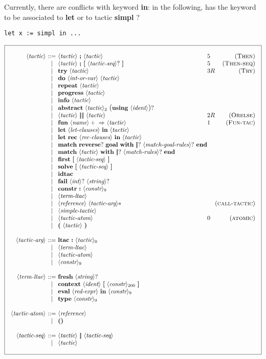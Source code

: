 \documentclass{article}
\makeatletter
\def\bfbar{\ensuremath{|\hskip -0.22em{}|\hskip -0.24em{}|}}
\def\TERMbar{\bfbar}
\def\TERMbarbar{\bfbar\bfbar}
\def\GR#1{\text{\large(}#1\text{\large)}}
\def\NT#1{\langle\textit{#1}\rangle}
\def\NTL#1#2{\langle\textit{#1}\rangle_{#2}}
\def\TERM#1{{\bf\textrm{\bf #1}}}
\def\KWD#1{\TERM{#1}}
\def\STAR#1{#1*}
\def\PLUS#1{#1+}
\def\OPT#1{#1?}
\def\OPTGR#1{\GR{#1}?}
\newenvironment{cadre}
        {\begin{array}{|c|}\hline\\}
        {\\\\\hline\end{array}}
\newenvironment{rulebox}
        {$$\begin{cadre}\begin{array}{r@{~}c@{~}l@{}l@{}r}}
        {\end{array}\end{cadre}$$}
\def\DEFNT#1{\NT{#1} & ::= &}
\def\RNAME#1{(\textsc{#1})}
\def\SEPDEF{\\\\}
\def\nlsep{\\&|&}
\newenvironment{rules}
        {\begin{center}\begin{rulebox}}
        {\end{rulebox}\end{center}}
\makeatother
\begin{document}
Currently, there are conflicts with keyword \KWD{in}: in the following,
has the keyword to be associated to \KWD{let} or to tactic \TERM{simpl} ?
\begin{center}
\texttt{let x := simpl in ...}
\end{center}


\begin{rules}
\DEFNT{tactic}
       \NT{tactic} ~\KWD{;} ~\NT{tactic}  &5 &\RNAME{Then}
\nlsep \NT{tactic} ~\KWD{;}~\TERM{[} ~\OPT{\NT{tactic-seq}} ~\TERM{]}
         &5 &\RNAME{Then-seq}
\nlsep \TERM{try} ~\NT{tactic}     &3R &\RNAME{Try}
\nlsep \TERM{do} ~\NT{int-or-var} ~\NT{tactic}
\nlsep \TERM{repeat} ~\NT{tactic}
\nlsep \TERM{progress} ~\NT{tactic}
\nlsep \TERM{info} ~\NT{tactic}
\nlsep \TERM{abstract}~\NTL{tactic}{2}~\OPTGR{\TERM{using}~\NT{ident}}
\nlsep \NT{tactic} ~\TERMbarbar ~\NT{tactic} &2R &\RNAME{Orelse}
\nlsep \KWD{fun} ~\PLUS{\NT{name}} ~\KWD{$\Rightarrow$}
       ~\NT{tactic}  &1 &\RNAME{Fun-tac}
\nlsep \KWD{let} ~\NT{let-clauses} ~\KWD{in} ~\NT{tactic}
\nlsep \KWD{let} ~\TERM{rec} ~\NT{rec-clauses} ~\KWD{in} ~\NT{tactic}
\nlsep \KWD{match}~\OPT{\TERM{reverse}}~\TERM{goal}~\KWD{with}
       ~\OPT{\TERMbar}~\OPT{\NT{match-goal-rules}} ~\KWD{end}
\nlsep \KWD{match} ~\NT{tactic} ~\KWD{with}
       ~\OPT{\TERMbar}~\OPT{\NT{match-rules}} ~\KWD{end}
\nlsep \TERM{first}~\TERM{[} ~\NT{tactic-seq} ~\TERM{]}
\nlsep \TERM{solve}~\TERM{[} ~\NT{tactic-seq} ~\TERM{]}
\nlsep \TERM{idtac}
\nlsep \TERM{fail} ~\OPT{\NT{int}} ~\OPT{\NT{string}}
\nlsep \TERM{constr}~\KWD{:}~\tacconstr
\nlsep \NT{term-ltac}
\nlsep \NT{reference}~\STAR{\NT{tactic-arg}}  &&\RNAME{call-tactic}
\nlsep \NT{simple-tactic}
\nlsep \NT{tactic-atom}  &0 &\RNAME{atomic}
\nlsep \KWD{(} ~\NT{tactic} ~\KWD{)}
\SEPDEF
\DEFNT{tactic-arg}
       \TERM{ltac}~\KWD{:}~\NTL{tactic}{0}
\nlsep \NT{term-ltac}
\nlsep \NT{tactic-atom}
\nlsep \tacconstr
\SEPDEF
\DEFNT{term-ltac}
       \TERM{fresh} ~\OPT{\NT{string}}
\nlsep \TERM{context} ~\NT{ident} ~\TERM{[} ~\taclconstr ~\TERM{]}
\nlsep \TERM{eval} ~\NT{red-expr} ~\KWD{in} ~\tacconstr
\nlsep \TERM{type} ~\tacconstr
\SEPDEF
\DEFNT{tactic-atom}
       \NT{reference}
\nlsep \TERM{()}
\SEPDEF
\DEFNT{tactic-seq}
       \NT{tactic} ~\TERMbar ~\NT{tactic-seq}
\nlsep \NT{tactic}
\end{rules}
\end{document}
